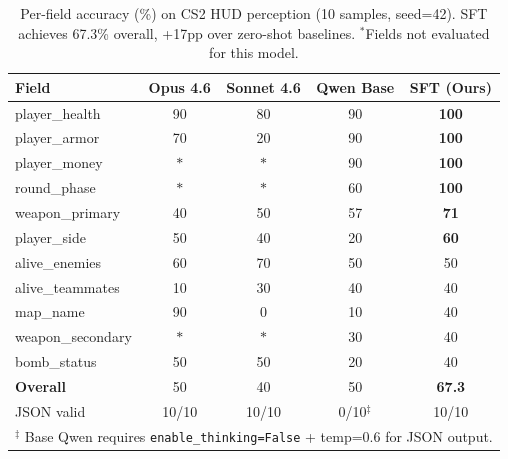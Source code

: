 \documentclass{article}
\begin{document}
\begin{table}[t]
\centering
\caption{Per-field accuracy (\%) on CS2 HUD perception (10 samples, seed=42). SFT achieves 67.3\% overall, +17pp over zero-shot baselines. $^\ast$Fields not evaluated for this model.}
\label{tab:sft_results}
\begin{tabular}{lcccc}
\toprule
\textbf{Field} & \textbf{Opus 4.6} & \textbf{Sonnet 4.6} & \textbf{Qwen Base} & \textbf{SFT (Ours)} \\
\midrule
player\_health       & 90  & 80  & 90  & \textbf{100} \\
player\_armor        & 70  & 20  & 90  & \textbf{100} \\
player\_money        & $\ast$ & $\ast$ & 90  & \textbf{100} \\
round\_phase         & $\ast$ & $\ast$ & 60  & \textbf{100} \\
weapon\_primary      & 40  & 50  & 57  & \textbf{71} \\
player\_side         & 50  & 40  & 20  & \textbf{60} \\
alive\_enemies       & 60  & 70  & 50  & 50 \\
alive\_teammates     & 10  & 30  & 40  & 40 \\
map\_name            & 90  & 0   & 10  & 40 \\
weapon\_secondary    & $\ast$ & $\ast$ & 30  & 40 \\
bomb\_status         & 50  & 50  & 20  & 40 \\
\midrule
\textbf{Overall}     & 50  & 40  & 50  & \textbf{67.3} \\
JSON valid           & 10/10 & 10/10 & 0/10$^\ddagger$ & 10/10 \\
\bottomrule
\multicolumn{5}{l}{\small $^\ddagger$ Base Qwen requires \texttt{enable\_thinking=False} + temp=0.6 for JSON output.} \\
\end{tabular}
\end{table}
\end{document}
